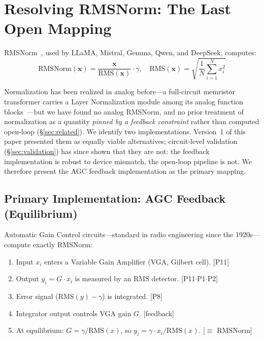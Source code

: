 \documentclass[11pt]{article}
\begin{document}
\section{Resolving RMSNorm: The Last Open Mapping}
\label{sec:rmsnorm}

RMSNorm~\cite{zhang_rmsnorm2019}, used by LLaMA, Mistral, Gemma, Qwen, and DeepSeek, computes:
\begin{equation}
\text{RMSNorm}(\mathbf{x}) = \frac{\mathbf{x}}{\text{RMS}(\mathbf{x})} \cdot \gamma, \quad \text{RMS}(\mathbf{x}) = \sqrt{\frac{1}{N}\sum_{i=1}^{N} x_i^2}
\end{equation}

Normalization has been realized in analog before---a full-circuit memristor transformer carries a Layer Normalization module among its analog function blocks~\cite{yang2022}---but we have found no analog RMSNorm, and no prior treatment of normalization as a quantity \textit{pinned by a feedback constraint} rather than computed open-loop (\S\ref{sec:related}). We identify two implementations. Version~1 of this paper presented them as equally viable alternatives; circuit-level validation (\S\ref{sec:validation}) has since shown that they are not: the feedback implementation is robust to device mismatch, the open-loop pipeline is not. We therefore present the AGC feedback implementation as the primary mapping.

\subsection{Primary Implementation: AGC Feedback (Equilibrium)}
\label{sec:agc}

Automatic Gain Control circuits---standard in radio engineering since the 1920s---compute exactly RMSNorm:

\begin{enumerate}[leftmargin=*]
\item Input $x_i$ enters a Variable Gain Amplifier (VGA, Gilbert cell). \hfill [P11]
\item Output $y_i = G \cdot x_i$ is measured by an RMS detector. \hfill [P11$\cdot$P1$\cdot$P2]
\item Error signal ($\text{RMS}(y) - \gamma$) is integrated. \hfill [P8]
\item Integrator output controls VGA gain $G$. \hfill [feedback]
\item At equilibrium: $G = \gamma / \text{RMS}(x)$, so $y_i = \gamma \cdot x_i / \text{RMS}(x)$. \hfill [$\equiv$ RMSNorm]
\end{enumerate}
\end{document}
